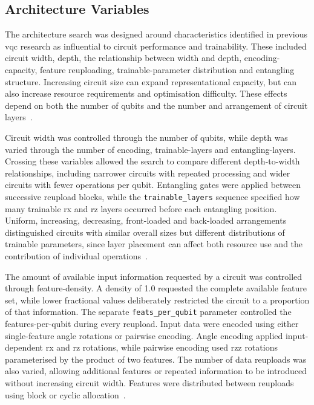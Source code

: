 \documentclass[]{UCD_CS_MSc_AAI_Report}
\begin{document}
\subsection{Architecture Variables}

The architecture search was designed around characteristics identified in previous \ac{vqc} research as influential to circuit performance and trainability. These included circuit width, depth, the relationship between width and depth, \gls{encoding-capacity}, feature reuploading, trainable-parameter distribution and entangling structure. Increasing circuit size can expand representational capacity, but can also increase resource requirements and optimisation difficulty. These effects depend on both the number of qubits and the number and arrangement of circuit layers~\cite{incudini_resource_2023,cerezo_challenges_2022,du_quantum_2025}.

Circuit width was controlled through the number of qubits, while depth was varied through the number of encoding, \glspl{trainable-layer} and \glspl{entangling-layer}. Crossing these variables allowed the search to compare different depth-to-width relationships, including narrower circuits with repeated processing and wider circuits with fewer operations per qubit. Entangling gates were applied between successive reupload blocks, while the \texttt{trainable\_layers} sequence specified how many trainable \ac{rx} and \ac{rz} layers occurred before each entangling position. Uniform, increasing, decreasing, front-loaded and back-loaded arrangements distinguished circuits with similar overall sizes but different distributions of trainable parameters, since layer placement can affect both resource use and the contribution of individual operations~\cite{salmenpera_impact_2024}.

The amount of available input information requested by a circuit was controlled through \gls{feature-density}. A density of 1.0 requested the complete available feature set, while lower fractional values deliberately restricted the circuit to a proportion of that information. The separate \texttt{feats\_per\_qubit} parameter controlled the \gls{features-per-qubit} during every reupload. Input data were encoded using either single-feature angle rotations or pairwise encoding. Angle encoding applied input-dependent \acs{rx} and \acs{rz} rotations, while pairwise encoding used \ac{rzz} rotations parameterised by the product of two features. The number of data reuploads was also varied, allowing additional features or repeated information to be introduced without increasing circuit width. Features were distributed between reuploads using block or cyclic allocation~\cite{du_quantum_2025,mcfarthing_classical_2024}.
\end{document}
